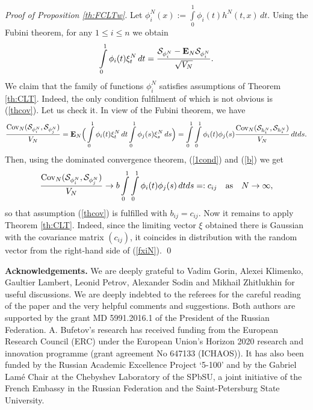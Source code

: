 \documentclass{article}
\numberwithin{equation}{section}
\newcommand{\SSS}{{\cal S}}
\newcommand{\Cov}{\operatorname{Cov}}
\newcommand{\ssk}{\smallskip}
\newcommand{\bsk}{\bigskip}
\newcommand{\MON}{\mbox{\bf E}_N}
\newcommand{\ra}{\rightarrow}
\newcommand{\fr}{\frac}
\newcommand{\ili}{\int\limits}
\newcommand{\lbl}{\label}
\newcommand{\ass}{\quad\mbox{as}\quad}
\newcommand{\rtheo}{Theorem \nolinebreak}
\newcommand{\bee}{\begin{equation}}
\newcommand{\eee}{\end{equation}}
\begin{document}
\ssk
{\it Proof of Proposition \ref{th:FCLTw}.}
Let $\phi_i^N(x):=\ili_{0}^{1}\phi_i(t)h^N(t,x)\,dt$.
Using the Fubini theorem, for any $1\leq i\leq n$ we obtain
$$
\ili_{0}^{1} \phi_i(t)\xi^N_t \, dt=\fr{\SSS_{\phi_i^N}-\MON\SSS_{\phi_i^N}}{\sqrt{V_N}}.
$$
We claim that the family of functions $\phi_i^N$ satisfies assumptions of \rtheo \ref{th:CLT}. Indeed, the only condition fulfilment of which is
not obvious is (\ref{thcov}). Let us check it. In view of the Fubini theorem, we have
$$
\fr{\Cov_N(\SSS_{\phi_i^N},\SSS_{\phi_j^N})}{V_N}
=\MON\Big(\ili_{0}^{1} \phi_i(t)\xi^N_t \, dt
\ili_{0}^{1} \phi_j(s)\xi^N_s \, ds\Big)
=\ili_{0}^{1}\ili_{0}^{1} \phi_i(t)\phi_j(s)\fr{\Cov_N(\SSS_{h^N_t},\SSS_{h^N_s})}{V_N} \, dtds.
$$
Then, using the dominated convergence theorem, (\ref{1cond}) and (\ref{b}) we get
\bee\lbl{newcov}
\fr{\Cov_N(\SSS_{\phi_i^N},\SSS_{\phi_j^N})}{V_N}
\ra
b \ili_{0}^{1}\ili_{0}^{1} \phi_i(t)\phi_j(s)\, dtds =:c_{ij}
\ass N\ra\infty,
\eee
so that assumption (\ref{thcov}) is fulfilled with $b_{ij}=c_{ij}$.
Now it remains to apply \rtheo \ref{th:CLT}.
Indeed, since the limiting vector $\xi$ obtained there
is Gaussian with the covariance matrix $(c_{ij})$,
it coincides in distribution with the random vector from the right-hand side of (\ref{fxiN}).
\qed
\ssk


\bsk

{\bf Acknowledgements.}
We are deeply grateful to   Vadim Gorin, Alexei Klimenko, Gaultier Lambert,  Leonid Petrov,  Alexander Sodin  and Mikhail Zhitlukhin for useful discussions.
We are deeply indebted to the referees for the careful reading of the 
paper and the very helpful comments and suggestions.
Both authors are supported by the grant MD 5991.2016.1 of the President of the Russian Federation.
A. Bufetov's research has received funding from the European Research Council
(ERC) under the European Union's Horizon 2020 research and innovation
programme (grant agreement No 647133 (ICHAOS)). It has also been
funded by the Russian Academic Excellence Project `5-100'
and
by the Gabriel Lam\'e Chair at the Chebyshev
Laboratory of the SPbSU,
a joint initiative of the French Embassy in the Russian Federation
and the Saint-Petersburg State University.
\end{document}

